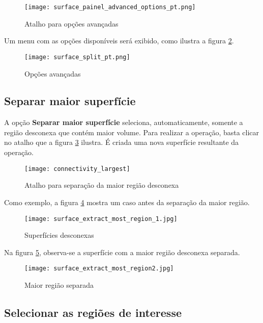 \begin{figure}[!htb]
\centering
\texttt{[image: surface\_painel\_advanced\_options\_pt.png]}
\caption{Atalho para opções avançadas}
\label{fig:advanced_tools}
\end{figure}

\newpage

Um menu com as opções disponíveis será exibido, como ilustra a figura
\ref{fig:advanced_tools_expanded}.

\begin{figure}[!htb]
\centering
\texttt{[image: surface\_split\_pt.png]}
\caption{Opções avançadas}
\label{fig:advanced_tools_expanded}
\end{figure}

\subsection{Separar maior superfície}

A opção \textbf{Separar maior superfície} seleciona, automaticamente, somente a região
desconexa que contém maior volume. Para realizar a operação, basta clicar no atalho
que a figura \ref{fig:short_connectivity_largest} ilustra. É criada uma nova superfície
resultante da operação.

\begin{figure}[!htb]
\centering
\texttt{[image: connectivity\_largest]}
\caption{Atalho para separação da maior região desconexa}
\label{fig:short_connectivity_largest}
\end{figure}

Como exemplo, a figura \ref{fig:extract_most_region_1} mostra um caso antes da separação
da maior região.

\begin{figure}[!htb]
\centering
\texttt{[image: surface\_extract\_most\_region\_1.jpg]}
\caption{Superfícies desconexas}
\label{fig:extract_most_region_1}
\end{figure}

Na figura \ref{fig:extract_most_region2}, observa-se a superfície com a maior região
desconexa separada.

\begin{figure}[!htb]
\centering
\texttt{[image: surface\_extract\_most\_region2.jpg]}
\caption{Maior região separada}
\label{fig:extract_most_region2}
\end{figure}

\newpage

\subsection{Selecionar as regiões de interesse}

